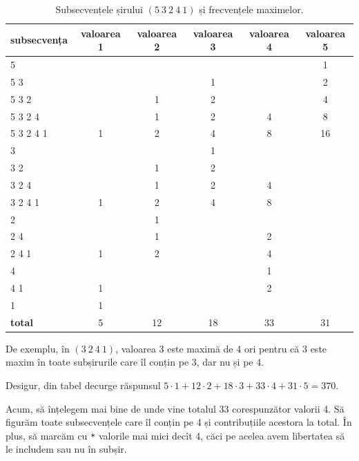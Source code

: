 \documentclass[../main.tex]{subfiles}
\begin{document}
\begin{table}[H]
  \centering
  \begin{tabular}{lccccc}
    \textbf{subsecvența} & \textbf{valoarea 1} & \textbf{valoarea 2} & \textbf{valoarea 3} & \textbf{valoarea 4} & \textbf{valoarea 5}\\
    \hline
    5              &   &    &    &    &  1 \\
    5 3            &   &    &  1 &    &  2 \\
    5 3 2          &   &  1 &  2 &    &  4 \\
    5 3 2 4        &   &  1 &  2 &  4 &  8 \\
    5 3 2 4 1      & 1 &  2 &  4 &  8 & 16 \\
    3              &   &    &  1 &    &    \\
    3 2            &   &  1 &  2 &    &    \\
    3 2 4          &   &  1 &  2 &  4 &    \\
    3 2 4 1        & 1 &  2 &  4 &  8 &    \\
    2              &   &  1 &    &    &    \\
    2 4            &   &  1 &    &  2 &    \\
    2 4 1          & 1 &  2 &    &  4 &    \\
    4              &   &    &    &  1 &    \\
    4 1            & 1 &    &    &  2 &    \\
    1              & 1 &    &    &    &    \\
    \hline
    \textbf{total} & 5 & 12 & 18 & 33 & 31 \\
  \end{tabular}

  \caption{Subsecvențele șirului $(5\ 3\ 2\ 4\ 1)$ și frecvențele maximelor.}
\end{table}

De exemplu, în $(3\ 2\ 4\ 1)$, valoarea 3 este maximă de 4 ori pentru că 3 este maxim în toate subșirurile care îl conțin pe 3, dar nu și pe 4.

Desigur, din tabel decurge răspunsul $5 \cdot 1 + 12 \cdot 2 + 18 \cdot 3 + 33 \cdot 4 + 31 \cdot 5 = 370$.

Acum, să înțelegem mai bine de unde vine totalul 33 corespunzător valorii 4. Să figurăm toate subsecvențele care îl conțin pe 4 și contribuțiile acestora la total. În plus, să marcăm cu \texttt{*} valorile mai mici decît 4, căci pe acelea avem libertatea să le includem sau nu în subșir.
\end{document}
